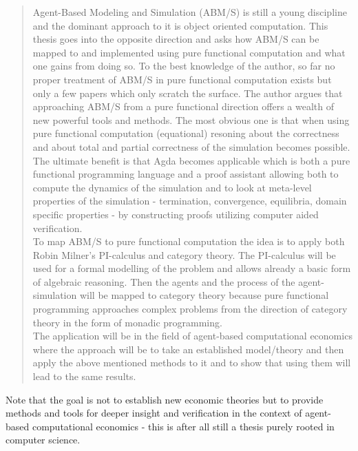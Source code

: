 \begin{quote}
Agent-Based Modeling and Simulation (ABM/S) is still a young discipline and the dominant approach to it is object oriented computation. This thesis goes into the opposite direction and asks how ABM/S can be mapped to and implemented using pure functional computation and what one gains from doing so. To the best knowledge of the author, so far no proper treatment of ABM/S in pure functional computation exists but only a few papers which only scratch the surface. The author argues that approaching ABM/S from a pure functional direction  offers a wealth of new powerful tools and methods. The most obvious one is that when using pure functional computation (equational) resoning about the correctness and about total and partial correctness of the simulation becomes possible. The ultimate benefit is that Agda becomes applicable which is both a pure functional programming language and a proof assistant allowing both to compute the dynamics of the simulation and to look at meta-level properties of the simulation - termination, convergence, equilibria, domain specific properties - by constructing proofs utilizing computer aided verification. \\
To map ABM/S to pure functional computation the idea is to apply both Robin Milner's PI-calculus and category theory. The PI-calculus will be used for a formal modelling of the problem and allows already a basic form of algebraic reasoning. Then the agents and the process of the agent-simulation will be mapped to category theory because pure functional programming approaches complex problems from the direction of category theory in the form of monadic programming. \\
The application will be in the field of agent-based computational economics where the approach will be to take an established model/theory and then apply the above mentioned methods to it and to show that using them will lead to the same results. 
\end{quote}

Note that the goal is not to establish new economic theories but to provide methods and tools for deeper insight and verification in the context of agent-based computational economics - this is after all still a thesis purely rooted in computer science.

